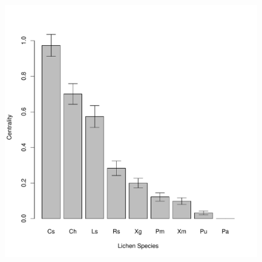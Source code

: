 \documentclass[11pt,twocolumn,twoside,lineno]{pnas-new}
\begin{document}
\begin{figure}[ht]
\centering
\includegraphics[width=\linewidth]{spp_cen.pdf}
\caption{}
\label{fig:spp_cen_app}
\end{figure}


\end{document}
